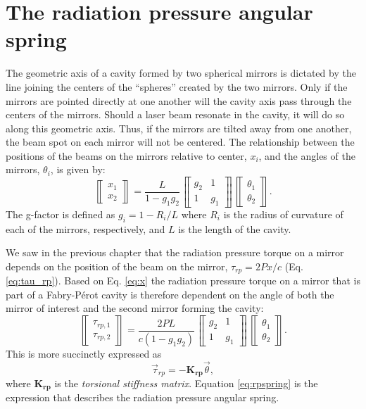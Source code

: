 \section{The radiation pressure angular spring}
The geometric axis of a cavity formed by two spherical mirrors is
dictated by the line joining the centers of the ``spheres'' created by
the two mirrors. Only if the mirrors are pointed directly at one
another will the cavity axis pass through the centers of the
mirrors. Should a laser beam resonate in the cavity, it will do so
along this geometric axis. Thus, if the mirrors are tilted away from
one another, the beam spot on each mirror will not be centered. The
relationship between the positions of the beams on the mirrors
relative to center, $x_i$, and the angles of the mirrors, $\theta_i$,
is given by:
\begin{equation}
\left\llbracket \begin{array}{c}
x_1\\
x_2 \end{array} \right\rrbracket = \frac{L}{1-g_1 g_2}
\left\llbracket \begin{array}{cc}
g_2 & 1\\
1 & g_1\end{array} \right\rrbracket
\left\llbracket \begin{array}{c}
\theta_1\\
\theta_2 \end{array} \right\rrbracket .
\label{eq:x}
\end{equation}
The g-factor is defined as $g_i=1-R_i/L$ where $R_i$ is the radius of
curvature of each of the mirrors, respectively, and $L$ is the length
of the cavity.

We saw in the previous chapter that the radiation pressure torque on a
mirror depends on the position of the beam on the mirror, $\tau_{rp} =
2 P x / c$ (Eq. \ref{eq:tau_rp}). Based on Eq. \ref{eq:x} the
radiation pressure torque on a mirror that is part of a
Fabry-P\'{e}rot cavity is therefore dependent on the angle of both the
mirror of interest and the second mirror forming the cavity:
\begin{equation}
\left\llbracket \begin{array}{c}
\tau_{rp,1}\\
\tau_{rp,2} \end{array} \right\rrbracket = \frac{2 P L}{c (1-g_1 g_2)}
\left\llbracket \begin{array}{cc}
g_2 & 1\\
1 & g_1\end{array} \right\rrbracket
\left\llbracket \begin{array}{c}
\theta_1\\
\theta_2 \end{array} \right\rrbracket.
\end{equation}
This is more succinctly expressed as
\begin{equation}
\vec{\tau}_{rp} = -\mathbf{K_{rp}} \vec{\theta},
\label{eq:rpspring}
\end{equation}
where $\mathbf{K_{rp}}$ is the \emph{torsional stiffness
  matrix}. Equation \ref{eq:rpspring} is the expression that describes
the radiation pressure angular spring.




